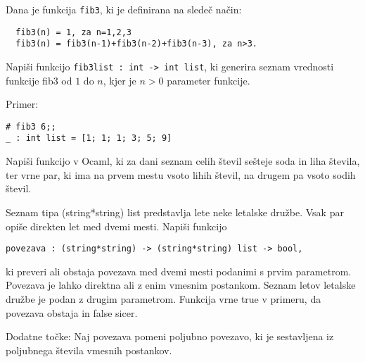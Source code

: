 \begin{ex}
  Dana je funkcija \lstinline{fib3}, ki je definirana na slede\v c na\v cin:
\begin{lstlisting}
  fib3(n) = 1, za n=1,2,3
  fib3(n) = fib3(n-1)+fib3(n-2)+fib3(n-3), za n>3.
\end{lstlisting}

  Napi\v si funkcijo 
  \lstinline{fib3list : int -> int list}, ki generira seznam
  vrednosti funkcije fib3 od $1$ do $n$, kjer je $n>0$ parameter funkcije.

\noindent\/Primer:
\begin{lstlisting}
# fib3 6;;
_ : int list = [1; 1; 1; 3; 5; 9]
\end{lstlisting}

%
%
%
\end{ex} 



\begin{ex}
Napi\v si funkcijo v Ocaml, ki za dani seznam celih \v stevil se\v steje soda in liha \v stevila, ter vrne par, ki ima na prvem mestu vsoto lihih \v stevil, na drugem pa vsoto sodih \v stevil.

\end{ex} 



\begin{ex}
  Seznam tipa (string*string) list predstavlja lete neke letalske
  dru\v zbe. Vsak par opi\v se direkten let med dvemi mesti. Napi\v si
  funkcijo

\begin{lstlisting}
povezava : (string*string) -> (string*string) list -> bool,
\end{lstlisting}

  ki preveri ali obstaja povezava med dvemi mesti podanimi s prvim
  parametrom. Povezava je lahko direktna ali z enim vmesnim
  postankom. Seznam letov letalske dru\v zbe je podan z drugim
  parametrom. Funkcija vrne true v primeru, da povezava obstaja in
  false sicer.

  Dodatne to\v cke: Naj povezava pomeni poljubno povezavo, ki je
  sestavljena iz poljubnega \v stevila vmesnih postankov.
\end{ex} 



